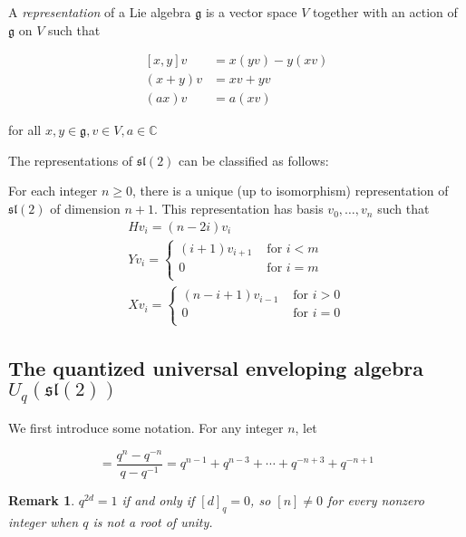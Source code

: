 \documentclass[]{article}
\newtheorem{remark}{Remark}
\begin{document}
A \emph{representation} of a Lie algebra $\mathfrak{g}$ is a vector space $V$ together with an action of $\mathfrak{g}$ on $V$ such that 

\begin{align*}
    \left[ x,y \right] v &= x(yv) - y(xv) \\
    (x+y)v &= xv + yv \\
    (ax)v &= a(xv)
\end{align*}

for all $x,y \in \mathfrak{g}, v \in V, a \in \mathbb{C}$

The representations of $\mathfrak{sl}(2)$ can be classified as follows: 

For each integer $n \geq 0$, there is a unique (up to isomorphism) representation of $\mathfrak{sl}(2)$ of dimension $n+1$. This representation has basis $v_0, \ldots, v_{n}$ such that
\begin{align*}
    &H v_i = (n - 2i) v_i& \\
    &Y v_i = \begin{cases} 
                (i+1)v_{i+1}& \text{ for $i < m$} \\
                0& \text{ for $i = m$} \\
            \end{cases} \\
    &X v_i = \begin{cases} 
                (n-i+1)v_{i-1}& \text{ for $i > 0$} \\
                0& \text{ for $i = 0$} \\
            \end{cases}
\end{align*}

\subsection{The quantized universal enveloping algebra $U_q(\mathfrak{sl}(2))$}
We first introduce some notation. For any integer $n$, let 

\begin{equation}
    [n] = \frac{q^n - q^{-n}}{q - q^{-1}} = q^{n-1} + q^{n-3} + \cdots + q^{-n+3} + q^{-n+1}
\end{equation}

\begin{remark}
$q^{2d}=1$ if and only if $[d]_q = 0$, so $[n] \neq 0$ for every nonzero integer when $q$ is not a root of unity. 
\end{remark}
\end{document}
